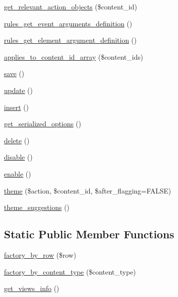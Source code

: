 \begin{CompactItemize}
\item 
\hyperlink{group__actions_g8f1b472c7f072dbfa682cc5b3fac9be6}{get\_\-relevant\_\-action\_\-objects} (\$content\_\-id)
\item 
\hyperlink{group__rules_g21a07dbe1a9e496438d235e95e67c048}{rules\_\-get\_\-event\_\-arguments\_\-definition} ()
\item 
\hyperlink{group__rules_g88951558f573d816de08b9e9d49ff4c2}{rules\_\-get\_\-element\_\-argument\_\-definition} ()
\item 
\hyperlink{group__views_g7ffe2653803be84d2c2d21dea608a6da}{applies\_\-to\_\-content\_\-id\_\-array} (\$content\_\-ids)
\item 
\hyperlink{classflag__flag_675d03274caed0ba6b3ecbb87f23f96b}{save} ()
\item 
\hyperlink{classflag__flag_c3b0083e0f201ea33788d82dd66fdffd}{update} ()
\item 
\hyperlink{classflag__flag_47d722a33b88e7e89c2bdf25651d665a}{insert} ()
\item 
\hyperlink{classflag__flag_b8713b708b7baf409dc9e7308d32a32c}{get\_\-serialized\_\-options} ()
\item 
\hyperlink{classflag__flag_0549e21ec17add57f7e7d0745bd8172d}{delete} ()
\item 
\hyperlink{classflag__flag_3d43e21496f28452d54f7e0581790c96}{disable} ()
\item 
\hyperlink{classflag__flag_5af2edf9238712cca6c20f79fdeeab22}{enable} ()
\item 
\hyperlink{classflag__flag_9f4c89ddd687305a3bf2ff7755b46b72}{theme} (\$action, \$content\_\-id, \$after\_\-flagging=FALSE)
\item 
\hyperlink{classflag__flag_84ceec72735b0bbffe52eb49f560d048}{theme\_\-suggestions} ()
\end{CompactItemize}
\subsection*{Static Public Member Functions}
\begin{CompactItemize}
\item 
\hyperlink{classflag__flag_7698e8030a65d8260b1e48fef20210b0}{factory\_\-by\_\-row} (\$row)
\item 
\hyperlink{classflag__flag_6441786f4f49a17b877e8bcdb9d6bbf5}{factory\_\-by\_\-content\_\-type} (\$content\_\-type)
\item 
\hyperlink{group__views_g91f53a4d24f7c81f8a913e56154821c0}{get\_\-views\_\-info} ()
\end{CompactItemize}
